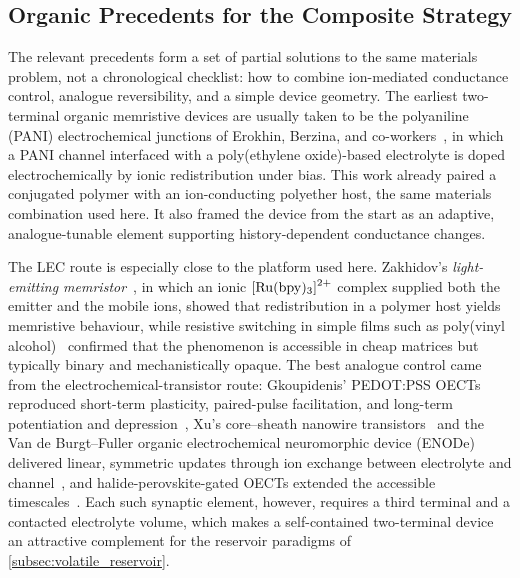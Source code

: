\documentclass[12pt, twoside]{report}
\begin{document}
\subsection{Organic Precedents for the Composite Strategy}\label{subsec:organic_precedents}

The relevant precedents form a set of partial solutions to the same materials problem, not a chronological checklist: how to combine ion-mediated conductance control, analogue reversibility, and a simple device geometry. The earliest two-terminal organic memristive devices are usually taken to be the polyaniline (PANI) electrochemical junctions of Erokhin, Berzina, and co-workers~\cite{Erokhin2005, Erokhin2007, Smerieri2008, Berzina2009}, in which a PANI channel interfaced with a poly(ethylene oxide)-based electrolyte is doped electrochemically by ionic redistribution under bias. This work already paired a conjugated polymer with an ion-conducting polyether host, the same materials combination used here. It also framed the device from the start as an adaptive, analogue-tunable element supporting history-dependent conductance changes.

The LEC route is especially close to the platform used here. Zakhidov's \emph{light-emitting memristor}~\cite{Zakhidov2010}, in which an ionic \(\ce{[Ru(bpy)3]^{2+}}\) complex supplied both the emitter and the mobile ions, showed that redistribution in a polymer host yields memristive behaviour, while resistive switching in simple films such as poly(vinyl alcohol)~\cite{Lei2014} confirmed that the phenomenon is accessible in cheap matrices but typically binary and mechanistically opaque. The best analogue control came from the electrochemical-transistor route: Gkoupidenis' PEDOT:PSS OECTs reproduced short-term plasticity, paired-pulse facilitation, and long-term potentiation and depression~\cite{Gkoupidenis2015, Gkoupidenis2017}, Xu's core--sheath nanowire transistors~\cite{Xu2016} and the Van de Burgt--Fuller organic electrochemical neuromorphic device (ENODe)~\cite{VanDeBurgt2017, Fuller2019} delivered linear, symmetric updates through ion exchange between electrolyte and channel~\cite{VanDeBurgt2018}, and halide-perovskite-gated OECTs extended the accessible timescales~\cite{Seo2019}. Each such synaptic element, however, requires a third terminal and a contacted electrolyte volume, which makes a self-contained two-terminal device an attractive complement for the reservoir paradigms of \cref{subsec:volatile_reservoir}.
\end{document}
